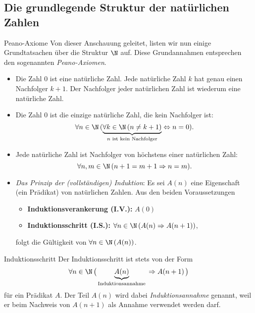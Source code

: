

\subsection{Die grundlegende Struktur der natürlichen Zahlen}

\begin{concept}{Peano-Axiome}
    Von dieser Anschauung geleitet, listen wir nun einige Grundtatsachen über die Struktur $\N$ auf. Diese Grundannahmen entsprechen den sogenannten \textit{Peano-Axiomen}.

\begin{itemize}
 \item Die Zahl $0$ ist eine natürliche Zahl. Jede natürliche Zahl $k$ hat genau einen Nachfolger $k+1$. Der Nachfolger jeder natürlichen Zahl ist wiederum eine natürliche Zahl.
 \item Die Zahl $0$ ist die einzige natürliche Zahl, die kein Nachfolger ist:
 \[
 \forall n\in\N\,(\underbrace{\forall k\in\N\,(n\neq k+1)}_{n\text{ ist kein Nachfolger}}\Leftrightarrow n=0 ).
 \]
 \item Jede natürliche Zahl ist Nachfolger von höchstens einer natürlichen Zahl:
 \[
 \forall n,m\in\N\,(n+1=m+1\Rightarrow n=m).
 \]
\item \textit{Das Prinzip der (vollständigen) Induktion}: Es sei $A(n)$ eine Eigenschaft (ein Prädikat) von natürlichen Zahlen. Aus den beiden Voraussetzungen
\begin{itemize}
\item[] \textbf{Induktionsverankerung (I.V.):} $A(0)$
\item[] \textbf{Induktionsschritt (I.S.):} $\forall n\in \N\,(A(n)\Rightarrow A(n+1))$,
\end{itemize}
folgt die Gültigkeit von $\forall n\in\N\,(A(n))$.
\end{itemize}
\end{concept}
 

\begin{lemma}{Induktionsschritt}
Der Induktionsschritt ist stets von der Form
\[
\forall n\in\N\,\big( \underbrace{A(n)}_{\text{Induktionsannahme}}\,\Rightarrow A(n+1)\,\big)
\]
für ein Prädikat $A$. Der Teil $A(n)$ wird dabei \textit{Induktionsannahme} genannt, weil er beim Nachweis von $A(n+1)$ als Annahme verwendet werden darf.
\end{lemma}

